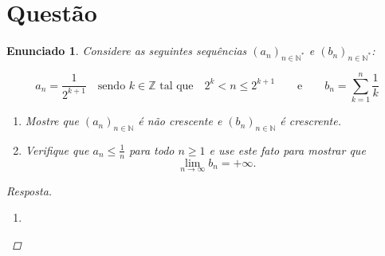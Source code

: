\documentclass[a4paper,twoside,11pt]{article}
\newtheorem*{enunciado}{Enunciado}
\begin{document}
\section{Questão}
\begin{enunciado}
    Considere as seguintes sequências $(a_n)_{n \in \mathbb{N}^*}$ e $(b_n)_{n \in \mathbb{N}^*}$:

    $$a_n = \dfrac{1}{2^{k + 1}}\quad\text{sendo } k \in \mathbb{Z} \text{ tal que}\quad 2^k < n \leq 2^{k+1} \qquad \text{e} \qquad b_n = \sum_{k=1}^n \dfrac{1}{k}$$

    \begin{enumerate}[label=\alph*)]
        \item Mostre que $(a_n)_{n \in \mathbb{N}}$ é não crescente e 
            $(b_n)_{n \in \mathbb{N}}$ é crescrente.

        \item Verifique que $a_n \leq \frac{1}{n}$ para todo $n \geq 1$ e use este fato
        para mostrar que $$\lim_{n \rightarrow \infty}{b_n} = +\infty.$$
    \end{enumerate}

    \begin{proof}[Resposta]
        \begin{enumerate}[label=\alph*)]
            \item 





\end{enumerate}
\end{proof}
\end{enunciado}
\end{document}
